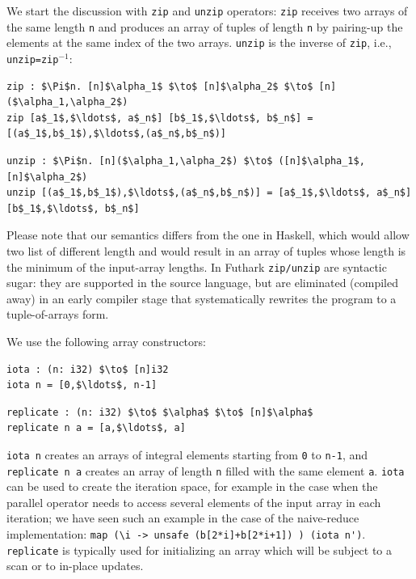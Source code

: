 \documentclass[acmsmall,review]{acmart}\settopmatter{printfolios=true,printccs=false,printacmref=false}
\begin{document}
We start the discussion with \lstinline{zip} and \lstinline{unzip} operators:
\lstinline{zip} receives two arrays of the same length {\tt n} and produces
an array of tuples of length {\tt n} by pairing-up the elements at the same
index of the two arrays. \lstinline{unzip} is the inverse of \lstinline{zip}, 
i.e., \lstinline{unzip=zip}$^{-1}$:
\begin{lstlisting}[mathescape=true]
zip : $\Pi$n. [n]$\alpha_1$ $\to$ [n]$\alpha_2$ $\to$ [n]($\alpha_1,\alpha_2$)
zip [a$_1$,$\ldots$, a$_n$] [b$_1$,$\ldots$, b$_n$] = [(a$_1$,b$_1$),$\ldots$,(a$_n$,b$_n$)]
\end{lstlisting}\vspace{-1ex}

\begin{lstlisting}[mathescape=true]
unzip : $\Pi$n. [n]($\alpha_1,\alpha_2$) $\to$ ([n]$\alpha_1$, [n]$\alpha_2$)
unzip [(a$_1$,b$_1$),$\ldots$,(a$_n$,b$_n$)] = [a$_1$,$\ldots$, a$_n$] [b$_1$,$\ldots$, b$_n$]
\end{lstlisting}\vspace{-2ex}

Please note that our semantics differs from the one in Haskell, which would allow
two list of different length and would result in an array of tuples whose length
is the minimum of the input-array lengths.  In Futhark \lstinline{zip/unzip} are
syntactic sugar: they are supported in the source language, but are eliminated
(compiled away) in an early compiler stage that systematically rewrites the 
program to a tuple-of-arrays form.

We use the following array constructors:  
\begin{lstlisting}[mathescape=true]
iota : (n: i32) $\to$ [n]i32
iota n = [0,$\ldots$, n-1]
\end{lstlisting}\vspace{-1ex}

\begin{lstlisting}[mathescape=true]
replicate : (n: i32) $\to$ $\alpha$ $\to$ [n]$\alpha$
replicate n a = [a,$\ldots$, a]
\end{lstlisting}\vspace{-2ex}
\lstinline{iota n} creates an arrays of integral elements starting from {\tt 0} 
to {\tt n-1}, and \lstinline{replicate n a} creates an array of length {\tt n} 
filled with the same element {\tt a}. \lstinline{iota} can be used to create
the iteration space, for example in the case when the parallel operator needs
to access several elements of the input array in each iteration; we have seen
such an example in the case of the naive-reduce implementation:
\lstinline{map (\i -> unsafe (b[2*i]+b[2*i+1]) ) (iota n')}.
\lstinline{replicate} is typically used for initializing an array which will
be subject to a scan or to in-place updates.   
\end{document}
